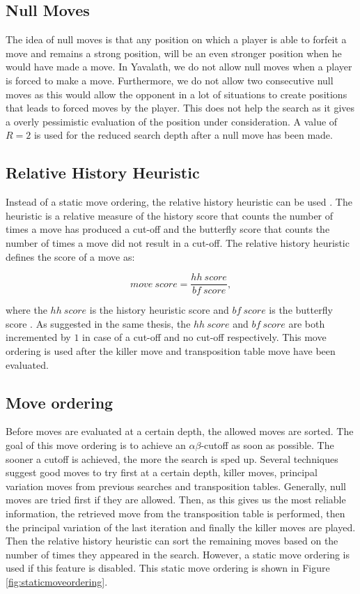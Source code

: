 \documentclass[11pt]{article}
\begin{document}
\subsection{Null Moves}
\label{-subsec:nullmoves}
The idea of null moves is that any position on which a player is able to forfeit a move and remains a strong position, will be an even stronger position when he would have made a move. In Yavalath, we do not allow null moves when a player is forced to make a move. Furthermore, we do not allow two consecutive null moves as this would allow the opponent in a lot of situations to create positions that leads to forced moves by the player. This does not help the search as it gives a overly pessimistic evaluation of the position under consideration. A value of $R=2$ is used for the reduced search depth after a null move has been made.

\subsection{Relative History Heuristic}
\label{-subsec:relativehistoryheuristic}
Instead of a static move ordering, the relative history heuristic can be used \cite{Herik}. The heuristic is a relative measure of the history score that counts the number of times a move has produced a cut-off and the butterfly score that counts the number of times a move did not result in a cut-off. The relative history heuristic defines the score of a move as:

\begin{equation}
	move\ score = \frac{hh\ score}{bf\ score},
\end{equation}

where the $hh\ score$ is the history heuristic score and $bf\ score$ is the butterfly score \cite{Winands2004}. As suggested in the same thesis, the $hh\ score$ and $bf\ score$ are both incremented by $1$ in case of a cut-off and no cut-off respectively. This move ordering is used after the killer move and transposition table move have been evaluated.

\subsection{Move ordering}
\label{-subsec:moveordering}
Before moves are evaluated at a certain depth, the allowed moves are sorted. The goal of this move ordering is to achieve an $\alpha\beta$-cutoff as soon as possible. The sooner a cutoff is achieved, the more the search is sped up. Several techniques suggest good moves to try first at a certain depth, killer moves, principal variation moves from previous searches and transposition tables. Generally, null moves are tried first if they are allowed. Then, as this gives us the most reliable information, the retrieved move from the transposition table is performed, then the principal variation of the last iteration and finally the killer moves are played. Then the relative history heuristic can sort the remaining moves based on the number of times they appeared in the search. However, a static move ordering is used if this feature is disabled. This static move ordering is shown in Figure \ref{fig:staticmoveordering}.
\end{document}
